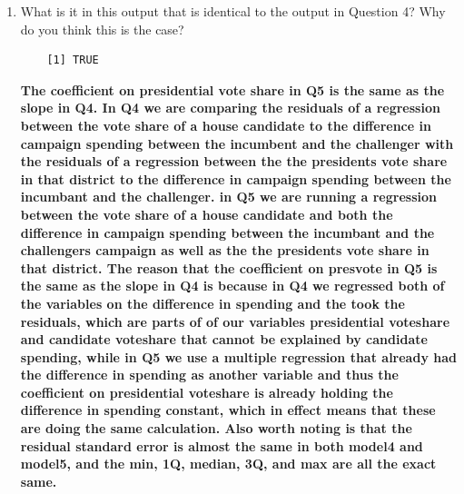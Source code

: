 \documentclass[12pt,letterpaper]{article}
\begin{document}
\begin{enumerate}
		\item What is it in this output that is identical to the output in Question 4? Why do you think this is the case?
	
\begin{verbatim}
	[1] TRUE
\end{verbatim}
\textbf{The coefficient on presidential vote share in Q5 is the same as the slope in Q4. In Q4 we are comparing the residuals of a regression between the vote share of a house candidate to the difference in campaign spending between the incumbent and the challenger with the residuals of a regression between the the presidents vote share in that district to the difference in campaign spending between the incumbant and the challenger. in Q5 we are running a regression between the vote share of a house candidate and both the difference in campaign spending between the incumbant and the challengers campaign as well as the the presidents vote share in that district. The reason that the coefficient on presvote in Q5 is the same as the slope in Q4 is because in Q4 we regressed both of the variables on the difference in spending and the took the residuals, which are parts of of our variables presidential voteshare and candidate voteshare that cannot be explained by candidate spending, while in Q5 we use a multiple regression that already had the difference in spending as another variable and thus the coefficient on presidential voteshare is already holding the difference in spending constant, which in effect means that these are doing the same calculation. Also worth noting is that the residual standard error is almost the same in both model4 and model5, and the min, 1Q, median, 3Q, and max are all the exact same.
}
	\end{enumerate}
\end{document}
